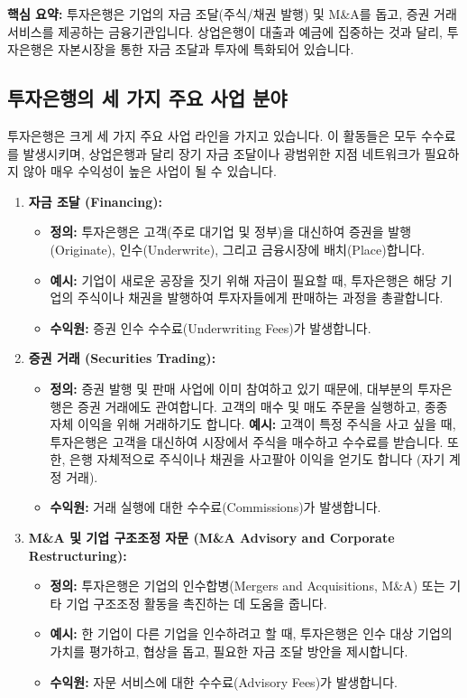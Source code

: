 \documentclass[11pt,a4paper]{article}
\theoremstyle{definition}
\begin{document}
\begin{summarybox}
\textbf{핵심 요약:} 투자은행은 기업의 자금 조달(주식/채권 발행) 및 M\&A를 돕고, 증권 거래 서비스를 제공하는 금융기관입니다. 상업은행이 대출과 예금에 집중하는 것과 달리, 투자은행은 자본시장을 통한 자금 조달과 투자에 특화되어 있습니다.
\end{summarybox}

\subsection{투자은행의 세 가지 주요 사업 분야}
투자은행은 크게 세 가지 주요 사업 라인을 가지고 있습니다. 이 활동들은 모두 수수료를 발생시키며, 상업은행과 달리 장기 자금 조달이나 광범위한 지점 네트워크가 필요하지 않아 매우 수익성이 높은 사업이 될 수 있습니다.

\begin{enumerate}
    \item \textbf{자금 조달 (Financing):}
    \begin{itemize}
        \item \textbf{정의:} 투자은행은 고객(주로 대기업 및 정부)을 대신하여 증권을 발행(Originate), 인수(Underwrite), 그리고 금융시장에 배치(Place)합니다.
        \item \textbf{예시:} 기업이 새로운 공장을 짓기 위해 자금이 필요할 때, 투자은행은 해당 기업의 주식이나 채권을 발행하여 투자자들에게 판매하는 과정을 총괄합니다.
        \item \textbf{수익원:} 증권 인수 수수료(Underwriting Fees)가 발생합니다.
    \end{itemize}

    \item \textbf{증권 거래 (Securities Trading):}
    \begin{itemize}
        \item \textbf{정의:} 증권 발행 및 판매 사업에 이미 참여하고 있기 때문에, 대부분의 투자은행은 증권 거래에도 관여합니다. 고객의 매수 및 매도 주문을 실행하고, 종종 자체 이익을 위해 거래하기도 합니다.
        \textbf{예시:} 고객이 특정 주식을 사고 싶을 때, 투자은행은 고객을 대신하여 시장에서 주식을 매수하고 수수료를 받습니다. 또한, 은행 자체적으로 주식이나 채권을 사고팔아 이익을 얻기도 합니다 (자기 계정 거래).
        \item \textbf{수익원:} 거래 실행에 대한 수수료(Commissions)가 발생합니다.
    \end{itemize}

    \item \textbf{M\&A 및 기업 구조조정 자문 (M\&A Advisory and Corporate Restructuring):}
    \begin{itemize}
        \item \textbf{정의:} 투자은행은 기업의 인수합병(Mergers and Acquisitions, M\&A) 또는 기타 기업 구조조정 활동을 촉진하는 데 도움을 줍니다.
        \item \textbf{예시:} 한 기업이 다른 기업을 인수하려고 할 때, 투자은행은 인수 대상 기업의 가치를 평가하고, 협상을 돕고, 필요한 자금 조달 방안을 제시합니다.
        \item \textbf{수익원:} 자문 서비스에 대한 수수료(Advisory Fees)가 발생합니다.
    \end{itemize}
\end{enumerate}
\end{document}
